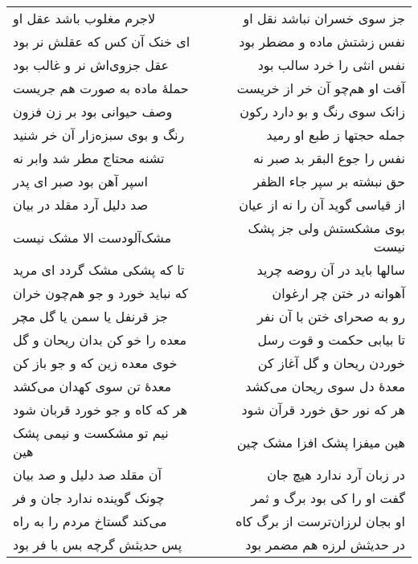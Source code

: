 \begin{center}
\begin{longtable}{l p{0.5cm} r}
\\
لاجرم مغلوب باشد عقل او
&&
جز سوی خسران نباشد نقل او
\\
ای خنک آن کس که عقلش نر بود
&&
نفس زشتش ماده و مضطر بود
\\
عقل جزوی‌اش نر و غالب بود
&&
نفس انثی را خرد سالب بود
\\
حملهٔ ماده به صورت هم جریست
&&
آفت او هم‌چو آن خر از خریست
\\
وصف حیوانی بود بر زن فزون
&&
زانک سوی رنگ و بو دارد رکون
\\
رنگ و بوی سبزه‌زار آن خر شنید
&&
جمله حجتها ز طبع او رمید
\\
تشنه محتاج مطر شد وابر نه
&&
نفس را جوع البقر بد صبر نه
\\
اسپر آهن بود صبر ای پدر
&&
حق نبشته بر سپر جاء الظفر
\\
صد دلیل آرد مقلد در بیان
&&
از قیاسی گوید آن را نه از عیان
\\
مشک‌آلودست الا مشک نیست
&&
بوی مشکستش ولی جز پشک نیست
\\
تا که پشکی مشک گردد ای مرید
&&
سالها باید در آن روضه چرید
\\
که نباید خورد و جو هم‌چون خران
&&
آهوانه در ختن چر ارغوان
\\
جز قرنفل یا سمن یا گل مچر
&&
رو به صحرای ختن با آن نفر
\\
معده را خو کن بدان ریحان و گل
&&
تا بیابی حکمت و قوت رسل
\\
خوی معده زین که و جو باز کن
&&
خوردن ریحان و گل آغاز کن
\\
معدهٔ تن سوی کهدان می‌کشد
&&
معدهٔ دل سوی ریحان می‌کشد
\\
هر که کاه و جو خورد قربان شود
&&
هر که نور حق خورد قرآن شود
\\
نیم تو مشکست و نیمی پشک هین
&&
هین میفزا پشک افزا مشک چین
\\
آن مقلد صد دلیل و صد بیان
&&
در زبان آرد ندارد هیچ جان
\\
چونک گوینده ندارد جان و فر
&&
گفت او را کی بود برگ و ثمر
\\
می‌کند گستاخ مردم را به راه
&&
او بجان لرزان‌ترست از برگ کاه
\\
پس حدیثش گرچه بس با فر بود
&&
در حدیثش لرزه هم مضمر بود
\\
\end{longtable}
\end{center}
